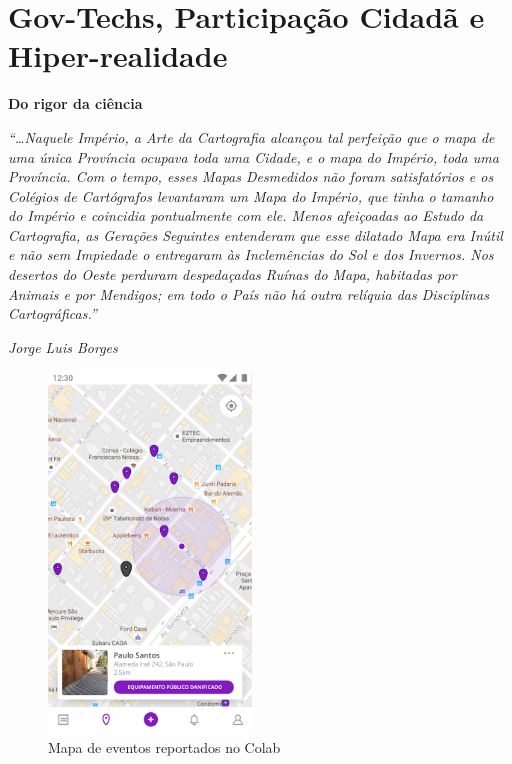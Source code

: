 \section{Gov-Techs, Participação Cidadã e Hiper-realidade}

\begin{citacao}
	\small{
		\textbf{Do rigor da ciência}

		\textit{“…Naquele  Império,  a  Arte  da  Cartografia  alcançou  tal  perfeição  que  o  mapa  de  uma  única  Província  ocupava  toda  uma  Cidade,  e  o  mapa  do  Império,  toda  uma  Província. Com o tempo, esses Mapas Desmedidos não foram satisfatórios e os Colégios de Cartógrafos levantaram um Mapa do Império, que tinha o tamanho do Império e coincidia pontualmente com ele. Menos afeiçoadas ao Estudo da  Cartografia,  as  Gerações  Seguintes  entenderam  que  esse dilatado Mapa era Inútil e não sem Impiedade o entregaram às Inclemências do Sol e dos Invernos. Nos desertos do Oeste perduram despedaçadas Ruínas do Mapa, habitadas por Animais e por Mendigos; em todo o País não há  outra  relíquia  das  Disciplinas  Cartográficas.”}

		\textit{Jorge Luis Borges}
	}
\end{citacao}

\begin{figure}[!htb]
	\centering
	\includegraphics[width=0.48\textwidth]{images/colab_app_map.png}
	\caption{Mapa de eventos reportados no Colab}
	\label{fig:colab_app_map}
\end{figure}

